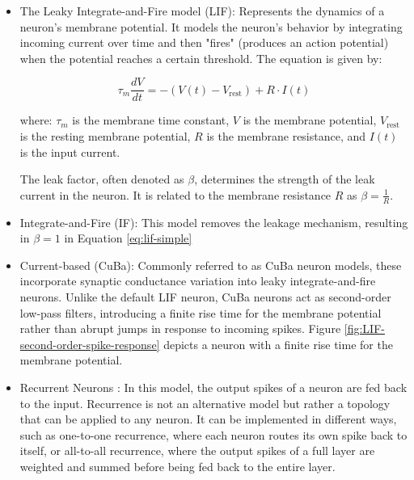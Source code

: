 \begin{itemize}

    \item The Leaky Integrate-and-Fire model (LIF): Represents the dynamics of a neuron's membrane potential. It models the neuron's behavior by integrating incoming current over time and then "fires" (produces an action potential) when the potential reaches a certain threshold. The equation is given by:
    
    \begin{equation}
    \tau_m \frac{{dV}}{{dt}} = -(V(t) - V_{\text{rest}}) + R \cdot I(t) \label{eq:lif-simple}
    \end{equation}
    
    where:
    \( \tau_m \) is the membrane time constant,
    \( V \) is the membrane potential,
    \( V_{\text{rest}} \) is the resting membrane potential,
    \( R \) is the membrane resistance,
    and \( I(t) \) is the input current.
    
    The leak factor, often denoted as \( \beta \), determines the strength of the leak current in the neuron. It is related to the membrane resistance \( R \) as \( \beta = \frac{1}{R} \).

    \item Integrate-and-Fire (IF): This model removes the leakage mechanism, resulting in \(\beta = 1\) in Equation \ref{eq:lif-simple}
    
    \item Current-based (CuBa): Commonly referred to as CuBa neuron models, these incorporate synaptic conductance variation into leaky integrate-and-fire neurons. Unlike the default LIF neuron, CuBa neurons act as second-order low-pass filters, introducing a finite rise time for the membrane potential rather than abrupt jumps in response to incoming spikes. Figure \ref{fig:LIF-second-order-spike-response} depicts a neuron with a finite rise time for the membrane potential.
    
    \item Recurrent Neurons \cite{williams1989learning}: In this model, the output spikes of a neuron are fed back to the input. Recurrence is not an alternative model but rather a topology that can be applied to any neuron. It can be implemented in different ways, such as one-to-one recurrence, where each neuron routes its own spike back to itself, or all-to-all recurrence, where the output spikes of a full layer are weighted and summed before being fed back to the entire layer.


\end{itemize}
